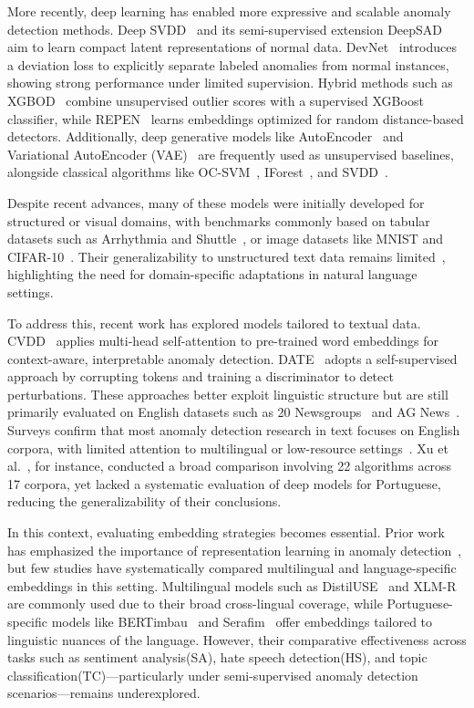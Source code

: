 \documentclass[12pt]{article}
\begin{document}
More recently, deep learning has enabled more expressive and scalable anomaly detection methods. Deep SVDD~\cite{Ruff2018} and its semi-supervised extension DeepSAD~\cite{Ruff2019} aim to learn compact latent representations of normal data. DevNet~\cite{Pang2019} introduces a deviation loss to explicitly separate labeled anomalies from normal instances, showing strong performance under limited supervision. Hybrid methods such as XGBOD~\cite{XGBOD} combine unsupervised outlier scores with a supervised XGBoost classifier, while REPEN~\cite{REPEN} learns embeddings optimized for random distance-based detectors. Additionally, deep generative models like AutoEncoder~\cite{hinton2006reducing} and Variational AutoEncoder (VAE)~\cite{kingma2013auto} are frequently used as unsupervised baselines, alongside classical algorithms like OC-SVM~\cite{OCSVM}, IForest~\cite{IForest}, and SVDD~\cite{tax2004svdd}.

Despite recent advances, many of these models were initially developed for structured or visual domains, with benchmarks commonly based on tabular datasets such as Arrhythmia and Shuttle~\cite{Pang2019}, or image datasets like MNIST and CIFAR-10~\cite{ruff-etal-2019-self, Ruff2019}. Their generalizability to unstructured text data remains limited~\cite{pang2021deep, xu-etal-2023-comparative}, highlighting the need for domain-specific adaptations in natural language settings.

To address this, recent work has explored models tailored to textual data. CVDD~\cite{CVDD} applies multi-head self-attention to pre-trained word embeddings for context-aware, interpretable anomaly detection. DATE~\cite{DATE} adopts a self-supervised approach by corrupting tokens and training a discriminator to detect perturbations. These approaches better exploit linguistic structure but are still primarily evaluated on English datasets such as 20 Newsgroups~\cite{lang1995newsweeder} and AG News~\cite{Zhang2015}. Surveys confirm that most anomaly detection research in text focuses on English corpora, with limited attention to multilingual or low-resource settings~\cite{pang2021deep, Boutalbi2023}. Xu et al.~\cite{xu-etal-2023-comparative}, for instance, conducted a broad comparison involving 22 algorithms across 17 corpora, yet lacked a systematic evaluation of deep models for Portuguese, reducing the generalizability of their conclusions.

In this context, evaluating embedding strategies becomes essential. Prior work has emphasized the importance of representation learning in anomaly detection~\cite{pang2021deep}, but few studies have systematically compared multilingual and language-specific embeddings in this setting. Multilingual models such as DistilUSE~\cite{reimers2019sentence} and XLM-R~\cite{conneau2020unsupervised} are commonly used due to their broad cross-lingual coverage, while Portuguese-specific models like BERTimbau~\cite{souza2020bertimbau} and Serafim~\cite{souza2023serafim} offer embeddings tailored to linguistic nuances of the language. However, their comparative effectiveness across tasks such as sentiment analysis(SA), hate speech detection(HS), and topic classification(TC)—particularly under semi-supervised anomaly detection scenarios—remains underexplored.
\end{document}
